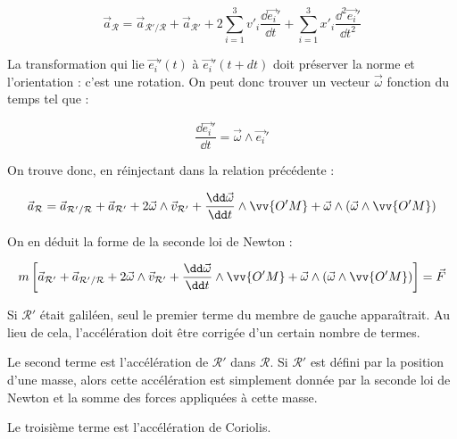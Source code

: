 \begin{equation}
\vec{a}_\mathcal{R} = \vec{a}_{\mathcal{R'}/\mathcal{R}}  + \vec{a}_\mathcal{R'}  + 2 \sum_{i = 1}^{3} v'_i \dfrac{\dd \vec{e_i}'}{\dd t} +  \sum_{i = 1}^{3} x'_i \dfrac{\dd^2 \vec{e_i}'}{\dd t^2}
\end{equation}

La transformation qui lie $\vec{e_i}'(t)$ à $\vec{e_i}'(t+dt)$ doit préserver la norme et l'orientation : c'est une rotation. On peut donc trouver un vecteur $\vec{\omega}$ fonction du temps tel que : 

\begin{equation}
\dfrac{\dd \vec{e_i}'}{\dd t} = \vec{\omega} \wedge \vec{e_i}'
\end{equation}

On trouve donc, en réinjectant dans la relation précédente :

\begin{equation}
\vec{a}_\mathcal{R} = \vec{a}_{\mathcal{R'}/\mathcal{R}}  + \vec{a}_\mathcal{R'}  + 2 \vec{\omega} \wedge \vec{v}_\mathcal{R'} + \dfrac{\dd \vec{\omega}}{\dd t}\wedge \vv{O'M} + \vec{\omega} \wedge \left ( \vec{\omega} \wedge \vv{O'M} \right )
\end{equation}

On en déduit la forme de la seconde loi de Newton :

\begin{equation}
m \left [ \vec{a}_\mathcal{R'}  + \vec{a}_{\mathcal{R'}/\mathcal{R}}  + 2 \vec{\omega} \wedge \vec{v}_\mathcal{R'} + \dfrac{\dd \vec{\omega}}{\dd t}\wedge \vv{O'M} + \vec{\omega} \wedge \left ( \vec{\omega} \wedge \vv{O'M} \right ) \right ] = \vec{F}
\end{equation}

Si $\mathcal{R}'$ était galiléen, seul le premier terme du membre de gauche apparaîtrait. Au lieu de cela, l'accélération doit être corrigée d'un certain nombre de termes.

 Le second terme est l'accélération de $\mathcal{R}'$ dans $\mathcal{R}$. Si $\mathcal{R}'$ est défini par la position d'une masse, alors cette accélération est simplement donnée par la seconde loi de Newton et la somme des forces appliquées à cette masse.

Le troisième terme est l'accélération de Coriolis.  
